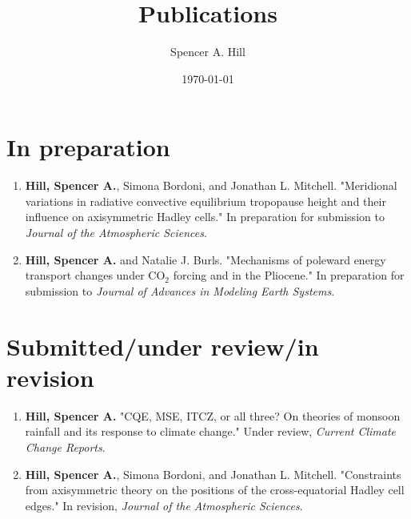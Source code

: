 \documentclass[12pt,letterpaper]{shillcv}
\author{Spencer A. Hill}
\date{\today}
\title{Publications}
\begin{document}
\maketitle


\section*{In preparation}
\label{sec:org669eb93}
\begin{enumerate}
\item \textbf{Hill, Spencer A.}, Simona Bordoni, and Jonathan L. Mitchell.  "Meridional
variations in radiative convective equilibrium tropopause height and their
influence on axisymmetric Hadley cells."  In preparation for submission to
\emph{Journal of the Atmospheric Sciences}.
\item \textbf{Hill, Spencer A.} and Natalie J. Burls.  "Mechanisms of poleward energy
transport changes under CO\(_2\) forcing and in the Pliocene."  In
preparation for submission to \emph{Journal of Advances in Modeling Earth
Systems}.
\end{enumerate}
\section*{Submitted/under review/in revision}
\label{sec:org6834ecc}
\begin{enumerate}
\item \textbf{Hill, Spencer A.} "CQE, MSE, ITCZ, or all three? On theories of monsoon
rainfall and its response to climate change."  Under review, \emph{Current Climate
Change Reports}.
\item \textbf{Hill, Spencer A.}, Simona Bordoni, and Jonathan L. Mitchell.  "Constraints
from axisymmetric theory on the positions of the cross-equatorial Hadley cell
edges."  In revision, \emph{Journal of the Atmospheric Sciences}.
\end{enumerate}
\end{document}
